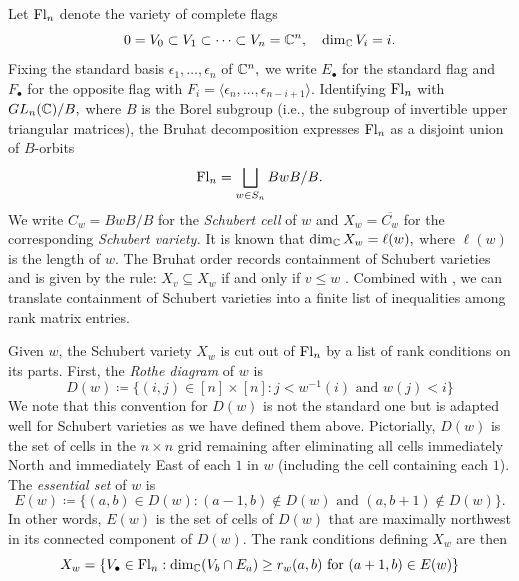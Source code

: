 Let $\mathrm{Fl}_n$ denote the variety of complete flags
\[
0 = V_0\subset V_1\subset \cdots\subset V_n = \mathbb{C}^n,\quad \dim_{\mathbb{C}} V_i = i.
\]
Fixing the standard basis $\epsilon_1,\ldots,\epsilon_n$ of $\mathbb{C}^n,$ we write $E_\bullet$ for the standard flag and $F_\bullet$ for the opposite flag with $F_i = \langle \epsilon_n,\ldots,\epsilon_{n-i+1}\rangle.$ Identifying $\mathrm{Fl}_n$ with $GL_n(\mathbb{C})/B,$ where $B$ is the Borel subgroup (i.e., the subgroup of invertible upper triangular matrices), the Bruhat decomposition expresses $\mathrm{Fl}_n$ as a disjoint union of $B$-orbits
\[
\mathrm{Fl}_n = \bigsqcup_{w\in S_n}BwB/B.
\]
We write $C_w = BwB/B$ for the \emph{Schubert cell} of $w$ and $X_w = \overline{C_w}$ for the corresponding \emph{Schubert variety.} It is known that $\dim_{\mathbb{C}} X_w = \ell(w),$ where $\ell(w)$ is the length of $w.$
The Bruhat order records containment of Schubert varieties and is given by the rule: $X_v\subseteq X_w$ if and only if $v\leq w$ \cite{FultonYoungTableaux}. Combined with , we can translate containment of Schubert varieties into a finite list of inequalities among rank matrix entries. 

Given $w$, the Schubert variety $X_w$ is cut out of $\mathrm{Fl}_n$ by a list of rank conditions on its parts. First, the \emph{Rothe diagram} of $w$ is
\[
D(w)\coloneqq \{(i,j)\in [n]\times [n] : j< w^{-1}(i)\text{ and }w(j) < i\}
\]
We note that this convention for $D(w)$ is not the standard one but is adapted well for Schubert varieties as we have defined them above. 
Pictorially, $D(w)$ is the set of cells in the $n\times n$ grid remaining after eliminating all cells immediately North and immediately East of each $1$ in $w$ (including the cell containing each $1$). The \emph{essential set} \cite{FultonYoungTableaux} of $w$ is
\[
E(w) \coloneqq \{(a,b) \in D(w): (a-1,b)\notin D(w)\text{ and }(a,b+1)\notin D(w)\}.
\]
In other words, $E(w)$ is the set of cells of $D(w)$ that are maximally northwest in its connected component of $D(w)$. 
The rank conditions defining $X_w$ are then
\[
X_w = \{V_\bullet\in \mathrm{Fl}_n : \dim_{\mathbb{C}}(V_b\cap E_a) \geq r_w(a,b)\text{ for }(a+1,b)\in E(w)\}
\]

